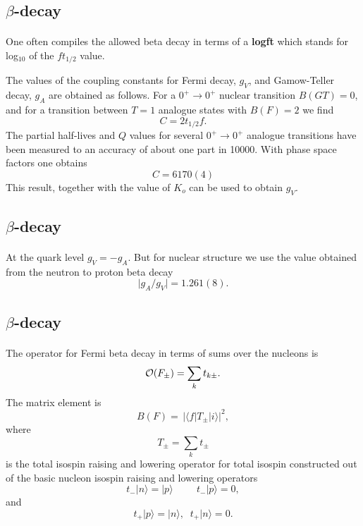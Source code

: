 \documentclass[%
oneside,                 %
final,                   %
10pt]{article}
\begin{document}
\subsection{$\beta$-decay}

\paragraph{}
One often compiles the allowed beta decay in terms of a \textbf{logft}
which stands for log$_{10}$ of the $ft_{1/2}$ value.

     The values of the coupling constants for Fermi decay,
$g_{V}$, and Gamow-Teller decay, $g_{A}$ are obtained as follows.
For a $0^{+} \rightarrow  0^{+}$ nuclear transition $B(GT)=0$, and for a
transition between $T=1$ analogue states with $B(F)=2$ we find 
\[
       C = 2 t_{1/2} f.  
\]
The partial half-lives and $Q$ values for several $0^{+} \rightarrow  0^{+}$ analogue
transitions have been measured to an accuracy of about one part in
10000. With  phase space factors one obtains 
\[
      C = 6170(4)    
\]
This result, together with the value of $K_{o}$ can be used to obtain $g_{V}$.



\subsection{$\beta$-decay}

\paragraph{}
At the quark level $g_{V}=-g_{A}$.
But for nuclear structure we use the value obtained from the
neutron to proton beta decay
\[
     \vert g_{A}/g_{V}\vert  = 1.261(8). 
\]



\subsection{$\beta$-decay}

\paragraph{}
The operator for Fermi beta decay in terms of sums
over the nucleons is
\[
{\cal O}(F_{\pm}) =  \displaystyle\sum _{k} t_{k\pm}.
\]
The matrix element is
\[
B(F) =\, \vert \langle f\vert  T_{\pm} \vert i\rangle\vert ^{2}, 
\]
where
\[
T_{\pm} = \sum _{k} t_{\pm}  
\]
is the total isospin raising and lowering operator for total
isospin constructed out of the
basic nucleon isospin raising and lowering operators
\[
t_{-}\vert n\rangle=\vert p\rangle \hspace{1cm} t_{-}\vert p\rangle= 0,
\]
and
\[
t_{+}\vert p\rangle=\vert n\rangle, \;\; t_{+}\vert n\rangle= 0.  
\]
\end{document}
